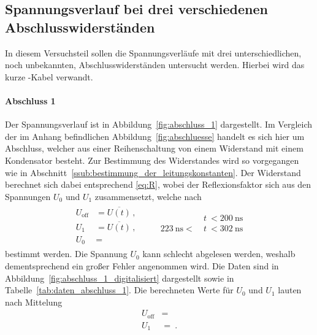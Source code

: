 \subsection{Spannungsverlauf bei drei verschiedenen Abschlusswiderständen}
\label{sub:spannungsverlauf_bei_drei_verschiedenen_abschlusswiderst_nden}

In diesem Versuchsteil sollen die Spannungsverläufe mit drei unterschiedlichen,
noch unbekannten, Abschlusswiderständen untersucht werden.
Hierbei wird das kurze \CU-Kabel verwandt.

\paragraph{Abschluss 1}
\label{ssub:abschluss_1}

Der Spannungsverlauf ist in Abbildung~\ref{fig:abschluss_1} dargestellt.
Im Vergleich der im Anhang befindlichen Abbildung~\ref{fig:abschluesse} handelt
es sich hier um Abschluss, welcher aus einer Reihenschaltung von einem
Widerstand mit einem Kondensator besteht.
Zur Bestimmung des Widerstandes wird so vorgegangen wie in
Abschnitt~\ref{ssub:bestimmung_der_leitungskonstanten}.
Der Widerstand berechnet sich dabei entsprechend \eqref{eq:R}, wobei der
Reflexionsfaktor sich aus den Spannungen $U_0$ und $U_1$ zusammensetzt, welche
nach
\begin{align}
  \begin{aligned}
    U_\text{off} &= \overline{U(t)}\,, \\
    U_1          &= \overline{U(t)}\,, \\
    U_0          &= 
  \end{aligned}
  \qquad
  \begin{aligned}
    &t~< \SI{200}{\nano\second} \\
    \SI{223}{\nano\second}  <~&t~< \SI{302}{\nano\second} \\
    &
  \end{aligned}
\end{align}
bestimmt werden. Die Spannung $U_0$ kann schlecht abgelesen werden, weshalb
dementsprechend ein großer Fehler angenommen wird.
Die Daten sind in Abbildung~\ref{fig:abschluss_1_digitalisiert} dargestellt
sowie in Tabelle~\ref{tab:daten_abschluss_1}.
Die berechneten Werte für $U_0$ und $U_1$ lauten nach Mittelung
\begin{align}
  U_\text{off} &=  \\
  U_1 &= ~.
\end{align}
